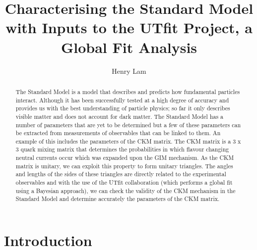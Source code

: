 \documentclass[12pt,a4paper]{article}
\title{Characterising the Standard Model with Inputs to the UTfit Project, a Global Fit Analysis}
\author{Henry Lam}
\begin{document}
\maketitle

\begin{abstract}
 
 
 The Standard Model is a model that describes and predicts how fundamental particles interact. Although it has been successfully tested at a high degree of accuracy and provides us with the best understanding of particle physics; so far it only describes visible matter and does not account for dark matter.  The Standard Model has a number of parameters that are yet to be determined but a few of these parameters can be extracted from measurements of observables that can be linked to them. An example of this includes the parameters of the CKM matrix. The CKM matrix is a 3 x 3 quark mixing matrix that determines the probabilities in which flavour changing neutral currents occur which was expanded upon the GIM mechanism. As the CKM matrix is unitary, we can exploit this property to form unitary triangles. The angles and lengths of the sides of these triangles are directly related to the experimental observables and with the use of the UTfit collaboration (which performs a global fit using a Bayesian approach), we can check the validity of the CKM mechanism in the Standard Model and determine accurately the parameters of the CKM matrix.
 
\end{abstract}

\newpage
\tableofcontents
\newpage

\section{Introduction}
\label{sec}
\end{document}
